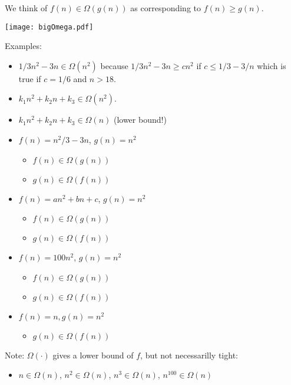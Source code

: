 \documentclass[11pt]{article}
\begin{document}

We think of $f(n) \in \Omega(g(n))$ as corresponding to $f(n)\geq g(n)$.

\texttt{[image: bigOmega.pdf]}


Examples:
  \begin{itemize}
  \item $1/3n^2-3n \in \Omega(n^2)$ because $1/3n^2-3n\geq cn^2$ if $c\leq 1/3-3/n$
  which is true if $c=1/6$ and $n>18$.
  \item $k_1n^2+k_2n+k_3 \in \Omega(n^2)$.
  \item $k_1n^2+k_2n+k_3 \in \Omega(n)$ (lower bound!)


\item $f(n) = n^2/3 -3n$, $g(n) = n^2$ 
    \begin{itemize}
    \item $f(n) \in \Omega(g(n))$
    \item  $g(n) \in \Omega(f(n))$
    \end{itemize}
\item $f(n) = an^2 + bn +c$, $g(n) = n^2$
    \begin{itemize}
    \item $f(n) \in \Omega(g(n))$
    \item  $g(n) \in \Omega(f(n))$
    \end{itemize}
\item $f(n) = 100n^2$, $g(n) = n^2$
    \begin{itemize}
    \item $f(n) \in \Omega(g(n))$
    \item  $g(n) \in \Omega(f(n))$
    \end{itemize}
\item $f(n) = n, g(n) = n^2$
    \begin{itemize}
    \item  $g(n) \in \Omega(f(n))$
    \end{itemize}
  \end{itemize}


Note: $\Omega(\cdot)$ gives a lower bound of $f$, but not necessarilly
tight:
\begin{itemize}
\item  $n \in \Omega(n)$,  $n^2 \in \Omega(n)$,  $n^3 \in \Omega(n)$,  $n^{100} \in \Omega(n)$
\end{itemize}
\end{document}
